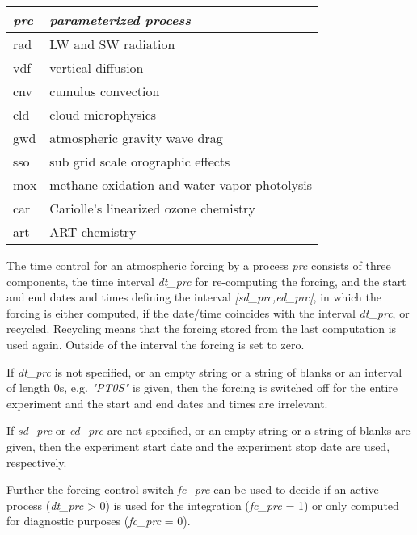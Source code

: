 \begin{table}[htbp]
\begin{center}
\begin{tabular}{l|l}
\textit{prc} & \textit{parameterized process} \\
\hline
rad & LW and SW radiation \\
vdf & vertical diffusion \\
cnv & cumulus convection \\
cld & cloud microphysics \\
gwd & atmospheric gravity wave drag \\
sso & sub grid scale orographic effects \\
mox & methane oxidation and water vapor photolysis \\
car & Cariolle's linearized ozone chemistry \\
art & ART chemistry \\
\end{tabular}
\end{center}
\label{default}
\end{table}%

The time control for an atmospheric forcing by a process \textit{prc} consists of three components, the time interval \textit{dt\_prc} for re-computing the forcing, and the start and end dates and times defining the interval \textit{[sd\_prc,ed\_prc[}, in which the forcing is either computed, if the date/time coincides with the interval \textit{dt\_prc}, or recycled. Recycling means that the forcing stored from the last computation is used again. Outside of the interval the forcing is set to zero.

If \textit{dt\_prc} is not specified, or an empty string or a string of blanks or an interval of length 0s, e.g. \textit{"PT0S"} is given, then the forcing is switched off for the entire experiment and the start and end dates and times are irrelevant.

If \textit{sd\_prc} or \textit{ed\_prc} are not specified, or an empty string or a string of blanks are given, then the experiment start date and the experiment stop date are used, respectively.

Further the forcing control switch \textit{fc\_prc} can be used to decide if an active process (\textit{dt\_prc} > 0) is used for the integration (\textit{fc\_prc} = 1) or only computed for diagnostic purposes (\textit{fc\_prc} = 0).

